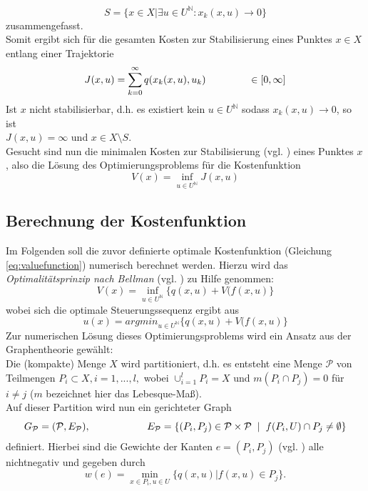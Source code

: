 \documentclass[12pt,a4paper,twoside]{article}
\begin{document}
	\begin{equation*}
		S=\{x\in X| \exists u\in U^{\mathds{N}}: x_k(x,u)\rightarrow 0\}
	\end{equation*}
	zusammengefasst. \\
	Somit ergibt sich für die gesamten Kosten zur Stabilisierung eines Punktes $x\in X$ entlang einer Trajektorie
	\begin{equation}
		J(x,u)=\sum_{k=0}^{\infty}q(x_k(x,u),u_k) \hspace{1.5cm} \in [0,\infty]
	\end{equation}
	Ist $x$ nicht stabilisierbar, d.h. es existiert kein $u\in U^{\mathds{N}}$ sodass $x_k(x,u)\rightarrow 0$, so ist \\$J(x,u)=\infty$ und $x\in X\setminus S$. \\
\newpage	Gesucht sind nun die minimalen Kosten zur Stabilisierung (vgl. \cite{Junge2004}) eines Punktes $x$, also die Lösung des Optimierungsproblems für die Kostenfunktion
	\begin{equation}
		\label{eq:valuefunction}
		V(x)=\inf_{u\in U^{\mathds{N}}}J(x,u)
	\end{equation}
	\subsection{Berechnung der Kostenfunktion}
	\label{sec:valuef}
	Im Folgenden soll die zuvor definierte optimale Kostenfunktion (Gleichung \ref{eq:valuefunction}) numerisch berechnet werden. Hierzu wird das \textit{Optimalitätsprinzip nach Bellman} (vgl. \cite{deuflhard2008}) zu Hilfe genommen:
	\begin{equation}
		\label{eq:bellman}
		V(x)=\inf_{u\in U^{\mathds{N}}}\{q(x,u)+V(f(x,u)\}
	\end{equation}
	wobei sich die optimale Steuerungssequenz ergibt aus
	\begin{equation}
		u(x)=argmin_{u\in U^{\mathds{N}}}\{q(x,u)+V(f(x,u)\}
	\end{equation}
	Zur numerischen Lösung dieses Optimierungsproblems wird ein Ansatz aus der Graphentheorie gewählt: \\
	Die (kompakte) Menge $X$ wird partitioniert, d.h. es entsteht eine Menge $\mathcal{P}$
	von Teilmengen $P_i\subset X, i=1,...,l,$ wobei $\cup_{i=1}^lP_i=X$ und $m(P_i \cap P_j)=0$ für $i\neq j$ ($m$ 
	bezeichnet hier das Lebesque-Maß). \\
	Auf dieser Partition wird nun ein gerichteter Graph 
	\begin{equation*}
		G_\mathcal{P}=(\mathcal{P},E_\mathcal{P}), \hspace{2cm} E_\mathcal{P}=\{(P_i,P_j)\in \mathcal{P}\times \mathcal{P} \hspace{2mm}|\hspace{2mm}f(P_i,U)\cap P_j\neq \emptyset\}
	\end{equation*}
	definiert. Hierbei sind die Gewichte der Kanten $e=(P_i,P_j)$ (vgl. \cite{Junge2004}) alle nichtnegativ und 
	gegeben durch
	\begin{equation*}
		w(e)=\min_{x\in P_i, u\in U}\{q(x,u)|f(x,u)\in P_j\}.
	\end{equation*}
	
\end{document}
